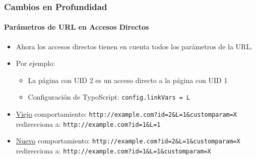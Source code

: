 \begin{frame}[fragile]
	\frametitle{Cambios en Profundidad}
	\framesubtitle{Parámetros de URL en Accesos Directos}

	\begin{itemize}
		\item Ahora los accesos directos tienen en cuenta todos los parámetros de la URL.
		\item Por ejemplo:

			\begin{itemize}
				\item La página con UID 2 es un acceso directo a la página con UID 1
				\item Configuración de TypoScript: \texttt{config.linkVars = L}
			\end{itemize}

		\item \underline{Viejo} comportamiento:\newline
			\smaller
				\tabto{0.5cm}\texttt{http://example.com?id=2\&L=1\&customparam=X}\newline
				redirecciona a:\newline
				\tabto{0.5cm}\texttt{http://example.com?id=1\&L=1}
			\normalsize

		\item \underline{Nuevo} comportamiento:\newline
			\smaller
				\tabto{0.5cm}\texttt{http://example.com?id=2\&L=1\&customparam=X}\newline
				redirecciona a:\newline
				\tabto{0.5cm}\texttt{http://example.com?id=1\&L=1\&customparam=X}
			\normalsize

	\end{itemize}

\end{frame}


